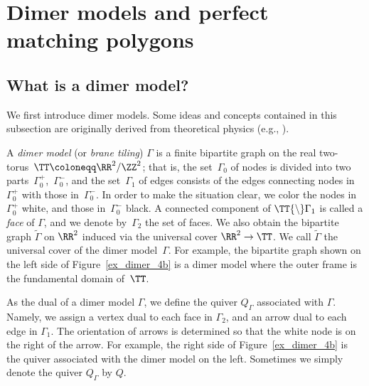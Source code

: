 \section{Dimer models and perfect matching polygons}\label{sec_pre_dimer}

\subsection{What is a dimer model?}
We first introduce dimer models. Some ideas and concepts contained in this subsection are originally derived from theoretical physics (e.g., \cite{FHK,HV}).

A \emph{dimer model} (or \emph{brane tiling}) $\Gamma$ is a finite bipartite graph on the real two-torus~$\TT\coloneqq\RR^2/\ZZ^2$; that is, the set~$\Gamma_0$ of nodes is divided into two parts~$\Gamma_0^+$,~$\Gamma_0^-$, and the set~$\Gamma_1$ of edges consists of the edges connecting nodes in~$\Gamma_0^+$ with those in~$\Gamma_0^-$.
In order to make the situation clear, we color the nodes in~$\Gamma_0^+$ white, and those in~$\Gamma_0^-$ black.
A connected component of $\TT{\setminus}\Gamma_1$ is called a \emph{face} of $\Gamma$, and we denote by~$\Gamma_2$ the set of faces.
We also obtain the bipartite graph $\widetilde{\Gamma}$ on $\RR^2$ induced via the universal cover $\RR^2\rightarrow\TT$.
We call $\widetilde{\Gamma}$ the universal cover of the dimer model~$\Gamma$.
For example, the bipartite graph shown on the left side of Figure~\ref{ex_dimer_4b} is a dimer model
where the outer frame is the fundamental domain of~$\TT$.

As the dual of a dimer model $\Gamma$, we define the quiver $Q_\Gamma$ associated with $\Gamma$.
Namely, we assign a vertex dual to each face in $\Gamma_2$, and an arrow dual to each edge in $\Gamma_1$.
The orientation of arrows is determined so that the white node is on the right of the arrow.
For example, the right side of Figure~\ref{ex_dimer_4b} is the quiver associated with the dimer model on the left.
Sometimes we simply denote the quiver $Q_\Gamma$ by $Q$.

\newcommand{\basicdimerB}{
\coordinate (W1) at (5,1); \coordinate (W2) at (1,3); \coordinate (W3) at (3,5);
\coordinate (B1) at (3,1); \coordinate (B2) at (1,5); \coordinate (B3) at (5,3);
\draw[line width=\edgewidth] (0,0) rectangle (6,6);
\draw[line width=\edgewidth] (W2)--(B1)--(W1)--(B3)--(W3)--(B2)--(W2); \draw[line width=\edgewidth] (B1)--(W3);
\draw[line width=\edgewidth] (0,3)--(W2); \draw[line width=\edgewidth] (3,0)--(B1); \draw[line width=\edgewidth] (6,0)--(W1);
\draw[line width=\edgewidth] (6,3)--(B3); \draw[line width=\edgewidth] (3,6)--(W3); \draw[line width=\edgewidth] (0,6)--(B2);
\draw [line width=\nodewidth, fill=black] (B1) circle [radius=\noderad] ;
\draw [line width=\nodewidth, fill=black] (B2) circle [radius=\noderad] ;
\draw [line width=\nodewidth, fill=black] (B3) circle [radius=\noderad] ;
\draw [line width=\nodewidth, fill=white] (W1) circle [radius=\noderad] ;
\draw [line width=\nodewidth, fill=white] (W2) circle [radius=\noderad] ;
\draw [line width=\nodewidth, fill=white] (W3) circle [radius=\noderad] ;
}

